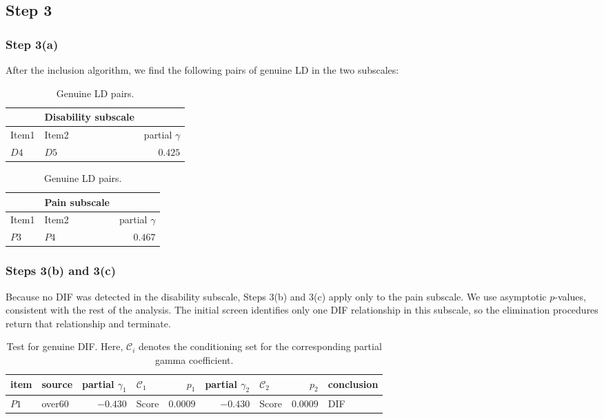 \subsection{Step 3}
\subsubsection{Step 3(a)}
After the inclusion algorithm, we find the following pairs of genuine LD in the two subscales:
\begin{table}[H]
    \centering
    \begin{minipage}{0.45\textwidth}
        \centering
        \begin{tabular}{l l r}
            & Disability subscale & \\
            \hline
            Item1 & Item2 & partial $\gamma$ \\ 
            \hline 
            $D4$ & $D5$ & $0.425$ \\
            \hline 
        \end{tabular}
        \caption{Genuine LD pairs.}
        \label{tab:disability_partial_gamma}
    \end{minipage}
    \hfill
    \begin{minipage}{0.45\textwidth}
        \centering
        \begin{tabular}{l l r}
            & Pain subscale & \\
            \hline
            Item1 & Item2 & partial $\gamma$ \\ 
            \hline 
            $P3$ & $P4$ & $0.467$ \\
            \hline 
        \end{tabular}
        \caption{Genuine LD pairs.}
        \label{tab:pain_partial_gamma}
    \end{minipage}
\end{table}

\subsubsection{Steps 3(b) and 3(c)}
Because no DIF was detected in the disability subscale, Steps 3(b) and 3(c) apply only to the pain subscale. We use asymptotic $p$-values, consistent with the rest of the analysis. The initial screen identifies only one DIF relationship in this subscale, so the elimination procedures return that relationship and terminate.
\begin{table}[H]
    \centering
    \begin{tabular}{l l r l r r l r l}
         item & source & partial $\gamma_1$ & $\mathcal{C}_1$ & $p_1$ & partial $\gamma_2$ & $\mathcal{C}_2$ & $p_2$ & conclusion \\
         \hline
          $P1$   &  over60 &     $-0.430$      &      Score & $0.0009$ &  $-0.430$   &  Score  &  $0.0009$& DIF\\
          \hline
    \end{tabular}
    \caption{Test for genuine DIF. Here, $\mathcal{C}_i$ denotes the conditioning set for the corresponding partial gamma coefficient.}
    \label{tab:step_3bc_ex}
\end{table}

